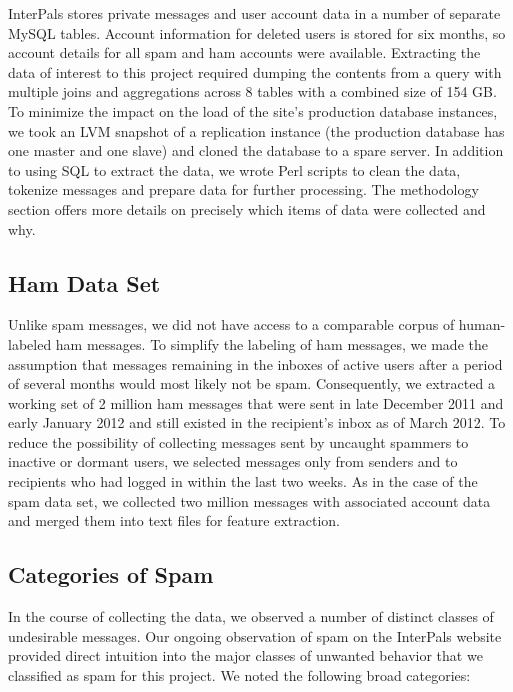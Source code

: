 \documentclass[preprint]{acm_proc_article-sp}
\begin{document}
InterPals stores private messages and user account data in a number of separate MySQL tables. 
Account information for deleted users is stored for six months, so account details for all spam 
and ham accounts were available. Extracting the data of interest to this project required 
dumping the contents from a query with multiple joins and aggregations across 8 tables with a 
combined size of 154 GB. To minimize the impact on the load of the site's production database 
instances, we took an LVM snapshot of a replication instance (the production database has one master and one 
slave) and cloned the database to a spare server. 
In addition to using SQL to extract the data, we wrote Perl scripts to clean the data, tokenize 
messages and prepare data for further processing. The methodology section offers more details 
on precisely which items of data were collected and why.

\subsection{Ham Data Set}

Unlike spam messages, we did not have access to a comparable corpus of human-labeled ham 
messages. To simplify the labeling of ham messages, we made the assumption that messages remaining in 
the inboxes of active users after a period of several months would most likely not be spam. 
Consequently, we extracted a working set of 2 million ham messages that were sent in late December 2011 and early 
January 2012 and still existed in the recipient's inbox as of March 2012. To reduce the 
possibility of collecting messages sent by uncaught spammers to inactive or dormant users, 
we selected messages only from senders and to recipients who had logged in within the last two 
weeks. As in the case of the spam data set, we collected two million messages with associated account 
data and merged them into text files for feature extraction.

\subsection{Categories of Spam}

In the course of collecting the data, we observed a number of distinct classes of 
undesirable messages. Our ongoing observation of spam on the InterPals website provided 
direct intuition into the major classes of unwanted behavior that we classified as spam for 
this project. We noted the following broad categories:
\end{document}
